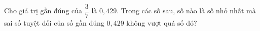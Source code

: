 \begin{ex}
Cho giá trị gần đúng của $\dfrac37$ là $0{,}429$. Trong các số sau, số nào là số nhỏ nhất mà sai số tuyệt đối của số gần đúng $0{,}429$ không vượt quá số đó?
\end{ex}
